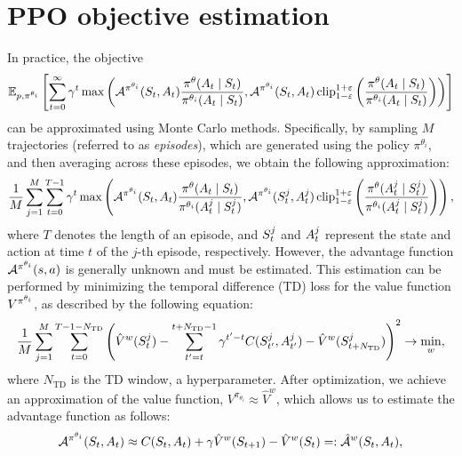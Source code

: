 \documentclass[12pt,twoside]{../../mitthesis}
\begin{document}
\section*{PPO objective estimation}
In practice, the objective 
$$
\E[\transit, \policy^{\theta_i}]{\sum_{t=0}^{\infty} \gamma ^ t \max\left(\Advan^{\policy^{\theta_i}}(\State_t, \Action_t)   \frac{\policy^{\theta}(\Action_t \mid \State_t)}{\policy^{\theta_i}(\Action_t \mid \State_t)}, \Advan^{\policy^{\theta_i}}(\State_t, \Action_t) \operatorname{clip}_{1 - \varepsilon}^{1 + \varepsilon}\left(\frac{\policy^{\theta}(\Action_t \mid \State_t)}{\policy^{\theta_i}(\Action_t \mid \State_t)}\right) \right)}
$$
can be approximated using Monte Carlo methods. Specifically, by sampling $M$ trajectories (referred to as \textit{episodes}), which are generated using the policy $\pi^{\theta_i}$, and then averaging across these episodes, we obtain the following approximation:
$$
    \frac{1}{M} \sum_{j = 1}^M \sum_{t=0}^{T-1} \gamma ^ t \max\left(\Advan^{\policy^{\theta_i}}(\State_t, \Action_t)   \frac{\policy^{\theta}(\Action_t \mid \State_t)}{\policy^{\theta_i}(\Action_t^j \mid \State_t^j)}, \Advan^{\policy^{\theta_i}}(\State_t^j, \Action_t^j) \operatorname{clip}_{1 - \varepsilon}^{1 + \varepsilon}\left(\frac{\policy^{\theta}(\Action_t^j \mid \State_t^j)}{\policy^{\theta_i}(\Action_t^j \mid \State_t^j)}\right) \right),
$$
where $T$ denotes the length of an episode, and  $\State_t^j$  and $\Action_t^j$ represent the state and action at time $t$ of the $j$-th episode, respectively.
However, the advantage function $\Advan^{\policy^{\theta_i}}(s, a)$ is generally unknown and must be estimated. This estimation can be performed by minimizing the temporal difference (TD) loss for the value function  $\Value^{\policy^{\theta_i}}$, as described by the following equation:
\begin{equation}
    \label{eqn_td_loss}
    \frac{1}{M}\sum_{j=1}^M\sum_{t=0}^{T-1 - N_{\text{TD}}}\left(\hat\Value^w(\State_t^j) - \sum_{t'=t}^{t + N_{\text{TD}} - 1} \gamma^{t'-t}\Cost(\State_{t'}^j, \Action_{t'}^j) - \hat\Value^w(\State_{t + N_{\text{TD}}}^j)\right)^2 \ra \min_{w},
\end{equation}
where $N_{\text{TD}}$ is the TD window, a hyperparameter.
After optimization, we achieve an approximation of the value function, $V^{\pi_{\theta_i}} \approx \hat{V}^w$, which allows us to estimate the advantage function as follows: 
\begin{equation}
    \label{eqn_advan_est}
    \Advan^{\policy^{\theta_i}}(\State_t, \Action_t) \approx \Cost(\State_t, \Action_t) + \gamma \hat\Value^w(\State_{t+1}) - \hat\Value^w(\State_t) =: \hat\Advan^{w}(\State_t, \Action_t) ,
\end{equation}
\end{document}
